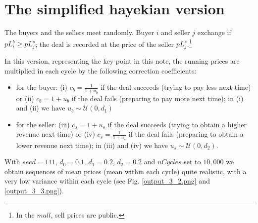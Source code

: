 \documentclass[10pt]{report}
\begin{document}
\section{The simplified hayekian version}\label{The hayekian version}
 
The buyers and the sellers meet randomly. Buyer $i$ and seller $j$ exchange if  $pL^b_i \geq pL^s_j$; the deal is recorded at the price of the seller $pL^s_j$.\footnote{In the $mall$, sell prices are public.}

In this version, representing the key point in this note, the running prices are multiplied in each cycle by the following  correction coefficients:

\begin{itemize}
\item for the buyer: (i) $c_b=\frac{1} {1 + u_b}$ if the deal succeeds (trying to pay less next time) or (ii) $c_b=1 + u_b$ if the deal fails (preparing to pay more next time); in (i) and (ii) we have $u_b\sim\mathcal{U}(0,d_1)$

\item for the seller: (iii) $c_s=1 + u_s$ if the deal succeeds (trying to obtain a higher revenue next time) or (iv) $c_s=\frac{1} {1 + u_s}$  if the deal fails (preparing to obtain a lower revenue next time); in (iii) and (iv) we have $u_s\sim\mathcal{U}(0,d_2)$.
\end{itemize}

With $seed=111$,  $d_0=0.1$, $d_1=0.2$, $d_2=0.2$ and $nCycles$ set to $10,000$ we obtain sequences of mean prices (mean within each cycle) quite realistic, with a very low variance within each cycle (see Fig. \ref{output_3_2.png} and \ref{output_3_3.png}).
\end{document}
